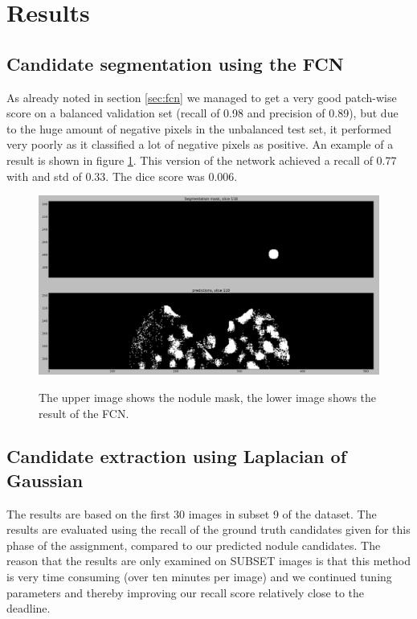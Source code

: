 \documentclass{article}
\begin{document}

\section{Results}\label{sec:results}
\subsection{Candidate segmentation using the FCN}
As already noted in section \ref{sec:fcn} we managed to get a very good patch-wise score on a balanced validation set (recall of 0.98 and precision of 0.89), but due to the huge amount of negative pixels in the unbalanced test set, it performed very poorly as it classified a lot of negative pixels as positive. An example of a result is shown in figure \ref{figure:nodules}. This version of the network achieved a recall of 0.77 with and std of 0.33. The dice score was 0.006. 

\begin{figure}[h]
	\centering
	{\includegraphics[width=0.7\linewidth]{./nog_steeds_slecht.jpg}}
	\caption{The upper image shows the nodule mask, the lower image shows the result of the FCN. \label{figure:nodules}}
\end{figure}

\subsection{Candidate extraction using Laplacian of Gaussian}
The results are based on the first 30 images in subset 9 of the dataset. The results are evaluated using the recall of the ground truth candidates given for this phase of the assignment, compared to our predicted nodule candidates. The reason that the results are only examined on SUBSET images is that this method is very time consuming (over ten minutes per image) and we continued tuning parameters and thereby improving our recall score relatively close to the deadline.
\end{document}
